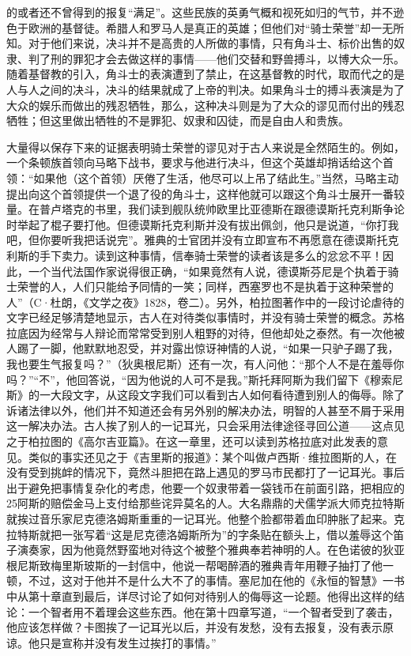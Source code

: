 \documentclass[12pt,oneside]{book}
\begin{document}
的或者还不曾得到的报复“满足”。这些民族的英勇气概和视死如归的气节，并不逊色于欧洲的基督徒。希腊人和罗马人是真正的英雄；但他们对“骑士荣誉”却一无所知。对于他们来说，决斗并不是高贵的人所做的事情，只有角斗士、标价出售的奴隶、判了刑的罪犯才会去做这样的事情——他们交替和野兽搏斗，以博大众一乐。随着基督教的引入，角斗士的表演遭到了禁止，在这基督教的时代，取而代之的是人与人之间的决斗，决斗的结果就成了上帝的判决。如果角斗士的搏斗表演是为了大众的娱乐而做出的残忍牺牲，那么，这种决斗则是为了大众的谬见而付出的残忍牺牲；但这里做出牺牲的不是罪犯、奴隶和囚徒，而是自由人和贵族。 

大量得以保存下来的证据表明骑士荣誉的谬见对于古人来说是全然陌生的。例如，一个条顿族首领向马略下战书，要求与他进行决斗，但这个英雄却捎话给这个首领：“如果他（这个首领）厌倦了生活，他尽可以上吊了结此生。”当然，马略主动提出向这个首领提供一个退了役的角斗士，这样他就可以跟这个角斗士展开一番较量。在普卢塔克的书里，我们读到舰队统帅欧里比亚德斯在跟德谟斯托克利斯争论时举起了棍子要打他。但德谟斯托克利斯并没有拔出佩剑，他只是说道，“你打我吧，但你要听我把话说完”。雅典的士官团并没有立即宣布不再愿意在德谟斯托克利斯的手下卖力。读到这种事情，信奉骑士荣誉的读者该是多么的忿忿不平！因此，一个当代法国作家说得很正确，“如果竟然有人说，德谟斯芬尼是个执着于骑士荣誉的人，人们只能给予同情的一笑；同样，西塞罗也不是执着于这种荣誉的人”（C·杜朗，《文学之夜》1828，卷二）。另外，柏拉图著作中的一段讨论虐待的文字已经足够清楚地显示，古人在对待类似事情时，并没有骑士荣誉的概念。苏格拉底因为经常与人辩论而常常受到别人粗野的对待，但他却处之泰然。有一次他被人踢了一脚，他默默地忍受，并对露出惊讶神情的人说，“如果一只驴子踢了我，我也要生气报复吗？”（狄奥根尼斯）还有一次，有人问他：“那个人不是在羞辱你吗？”“不”，他回答说，“因为他说的人可不是我。”斯托拜阿斯为我们留下《穆索尼斯》的一大段文字，从这段文字我们可以看到古人如何看待遭到别人的侮辱。除了诉诸法律以外，他们并不知道还会有另外别的解决办法，明智的人甚至不屑于采用这一解决办法。古人挨了别人的一记耳光，只会采用法律途径寻回公道——这点见之于柏拉图的《高尔吉亚篇》。在这一章里，还可以读到苏格拉底对此发表的意见。类似的事实还见之于《吉里斯的报道》：某个叫做卢西斯·维拉图斯的人，在没有受到挑衅的情况下，竟然斗胆把在路上遇见的罗马市民都打了一记耳光。事后出于避免把事情复杂化的考虑，他要一个奴隶带着一袋钱币在前面引路，把相应的25阿斯的赔偿金马上支付给那些诧异莫名的人。大名鼎鼎的犬儒学派大师克拉特斯就挨过音乐家尼克德洛姆斯重重的一记耳光。他整个脸都带着血印肿胀了起来。克拉特斯就把一张写着“这是尼克德洛姆斯所为”的字条贴在额头上，借以羞辱这个笛子演奏家，因为他竟然野蛮地对待这个被整个雅典奉若神明的人。在色诺彼的狄亚根尼斯致梅里斯玻斯的一封信中，他说一帮喝醉酒的雅典青年用鞭子抽打了他一顿，不过，这对于他并不是什么大不了的事情。塞尼加在他的《永恒的智慧》一书中从第十章直到最后，详尽讨论了如何对待别人的侮辱这一论题。他得出这样的结论：一个智者用不着理会这些东西。他在第十四章写道，“一个智者受到了袭击，他应该怎样做？卡图挨了一记耳光以后，并没有发愁，没有去报复，没有表示原谅。他只是宣称并没有发生过挨打的事情。” 
\end{document}

